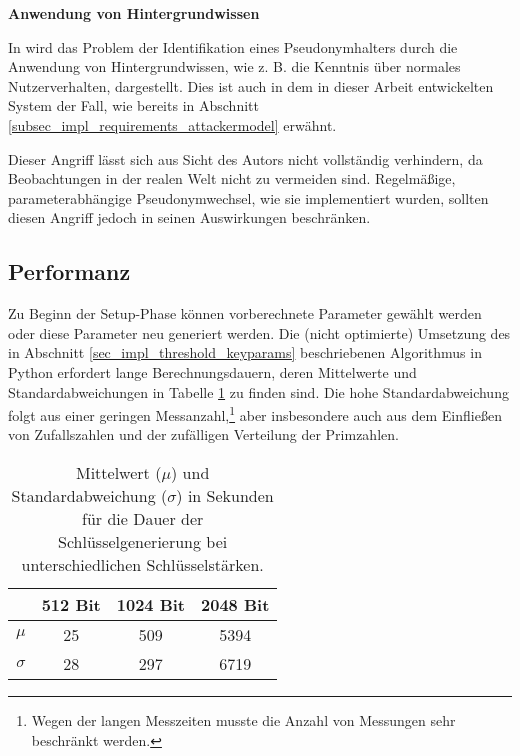 
\textbf{Anwendung von Hintergrundwissen}

In \cite{lundin1999privacy} wird das Problem der Identifikation eines Pseudonymhalters durch die Anwendung von Hintergrundwissen, wie z. B. die Kenntnis über normales Nutzerverhalten, dargestellt. Dies ist auch in dem in dieser Arbeit entwickelten System der Fall, wie bereits in Abschnitt \ref{subsec_impl_requirements_attackermodel} erwähnt. 

Dieser Angriff lässt sich aus Sicht des Autors nicht vollständig verhindern, da Beobachtungen in der realen Welt nicht zu vermeiden sind. Regelmäßige, parameterabhängige Pseudonymwechsel, wie sie implementiert wurden, sollten diesen Angriff jedoch in seinen Auswirkungen beschränken.



\subsection{Performanz}

Zu Beginn der Setup-Phase können vorberechnete Parameter gewählt werden oder diese Parameter neu generiert werden. Die (nicht optimierte) Umsetzung des in Abschnitt \ref{sec_impl_threshold_keyparams} beschriebenen Algorithmus in Python erfordert lange Berechnungsdauern, deren Mittelwerte und Standardabweichungen in Tabelle \ref{tab_key_generation} zu finden sind. Die hohe Standardabweichung folgt aus einer geringen Messanzahl,\footnote{
  Wegen der langen Messzeiten musste die Anzahl von Messungen sehr beschränkt werden.
} aber insbesondere auch aus dem Einfließen von Zufallszahlen und der zufälligen Verteilung der Primzahlen. 

\begin{table}
  \centering
  \begin{tabular}{|c|c|c|c|}
  \hline 
   & \textbf{512 Bit} & \textbf{1024 Bit} & \textbf{2048 Bit }\\ 
  \hline 
  \(\mu\) & 25  & 509 & 5394 \\ 
  \hline 
  \(\sigma\) & 28  & 297 & 6719 \\ 
  \hline 
  \end{tabular} 
  \caption{Mittelwert (\(\mu\)) und Standardabweichung (\(\sigma\)) in Sekunden für die Dauer der Schlüsselgenerierung bei unterschiedlichen Schlüsselstärken.}
  \label{tab_key_generation}
\end{table}

